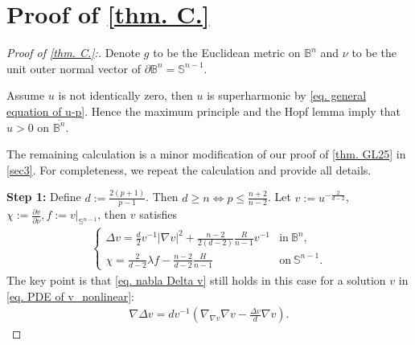 \documentclass[12pt]{amsart}
\numberwithin{equation}{section}
\numberwithin{lemma}{section}
\numberwithin{proposition}{section}
\numberwithin{corollary}{section}
\numberwithin{remark}{section}
\begin{document}
\section{Proof of \cref{thm. C.}}\label{sec4}
\begin{proof}[Proof of \cref{thm. C.}:]
    Denote $g$ to be the Euclidean metric on $\mathbb{B}^n$ and $\nu$ to be the unit outer normal vector of $\partial \mathbb{B}^n=\mathbb{S}^{n-1}$.

    Assume $u$ is not identically zero, then $u$ is superharmonic by \cref{eq. general equation of u-p}. Hence the maximum principle and the Hopf lemma imply that $u>0$ on $\overline{\mathbb{B}^n}$. 
    
    The remaining calculation is a minor modification of our proof of \cref{thm. GL25} in \cref{sec3}. For completeness, we repeat the calculation and provide all details.

\textbf{Step 1:}    Define $d:=\frac{2(p+1)}{p-1}$. Then $d\geq n\Leftrightarrow p\leq \frac{n+2}{n-2}$. Let $v:=u^{-\frac{2}{d-2}}$, $\chi:=\frac{\partial v}{\partial \nu}, f:=v|_{\mathbb{S}^{n-1}}$, then $v$ satisfies
    \begin{align}\label{eq. PDE of v_nonlinear}
        \begin{cases}
            \Delta v=\frac{d}{2}v^{-1}|\nabla v|^2+\frac{n-2}{2(d-2)}\frac{R}{n-1}v^{-1} &\mathrm{in}\ \mathbb{B}^n,\\
            \chi=\frac{2}{d-2}\lambda f-\frac{n-2}{d-2}\frac{H}{n-1} &\mathrm{on}\ \mathbb{S}^{n-1}.
        \end{cases}
    \end{align}
    The key point is that \cref{eq. nabla Delta v} still holds in this case for a solution $v
    $ in \cref{eq. PDE of v_nonlinear}:
    \begin{align}\label{eq. 2nd nabla delta v}
        \nabla \Delta v
        =dv^{-1}
        \left(\nabla_{\nabla v}\nabla v-\frac{\Delta v}{d}\nabla v\right).
    \end{align}


\end{proof}
\end{document}
